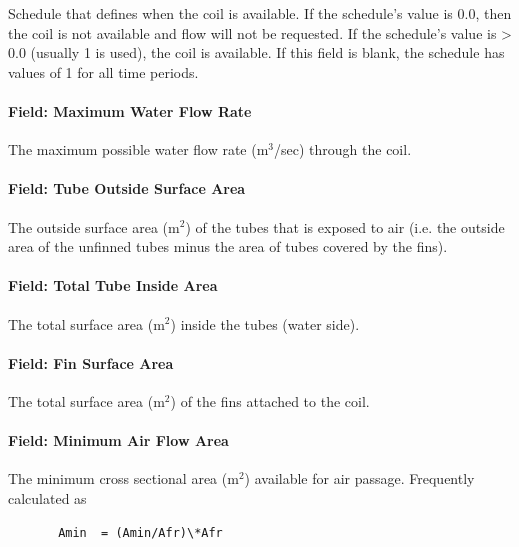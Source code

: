 Schedule that defines when the coil is available. If the schedule's value is 0.0, then the coil is not available and flow will not be requested. If the schedule's value is \textgreater{} 0.0 (usually 1 is used), the coil is available. If this field is blank, the schedule has values of 1 for all time periods.

\paragraph{Field: Maximum Water Flow Rate}\label{field-maximum-water-flow-rate-1}

The maximum possible water flow rate (m\(^{3}\)/sec) through the coil.

\paragraph{Field: Tube Outside Surface Area}\label{field-tube-outside-surface-area}

The outside surface area (m\(^{2}\)) of the tubes that is exposed to air (i.e. the outside area of the unfinned tubes minus the area of tubes covered by the fins).

\paragraph{Field: Total Tube Inside Area}\label{field-total-tube-inside-area}

The total surface area (m\(^{2}\)) inside the tubes (water side).

\paragraph{Field: Fin Surface Area}\label{field-fin-surface-area}

The total surface area (m\(^{2}\)) of the fins attached to the coil.

\paragraph{Field: Minimum Air Flow Area}\label{field-minimum-air-flow-area}

The minimum cross sectional area (m\(^{2}\)) available for air passage. Frequently calculated as

\begin{lstlisting}
       Amin  = (Amin/Afr)\*Afr
\end{lstlisting}


